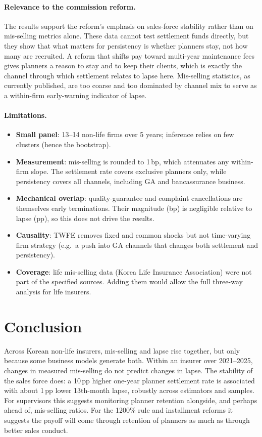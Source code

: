 \documentclass[11pt,a4paper]{article}
\begin{document}
\paragraph{Relevance to the commission reform.} The results support the reform's emphasis on sales-force
stability rather than on mis-selling metrics alone. These data cannot test settlement funds directly, but they show
that what matters for persistency is whether planners stay, not how many are recruited. A reform that shifts pay toward multi-year maintenance fees gives
planners a reason to stay and to keep their clients, which is exactly the channel through which settlement
relates to lapse here. Mis-selling statistics, as currently published, are too coarse and too dominated by
channel mix to serve as a within-firm early-warning indicator of lapse.

\paragraph{Limitations.}
\begin{itemize}
  \item \textbf{Small panel}: 13--14 non-life firms over 5 years; inference relies on few clusters (hence the bootstrap).
  \item \textbf{Measurement}: mis-selling is rounded to 1\,bp, which attenuates any within-firm slope. The
        settlement rate covers exclusive planners only, while persistency covers all channels, including GA and
        bancassurance business.
  \item \textbf{Mechanical overlap}: quality-guarantee and complaint cancellations are themselves early
        terminations. Their magnitude (bp) is negligible relative to lapse (pp), so this does not drive the results.
  \item \textbf{Causality}: TWFE removes fixed and common shocks but not time-varying firm strategy (e.g.\ a push into GA channels that changes both settlement and persistency).
  \item \textbf{Coverage}: life mis-selling data (Korea Life Insurance Association) were not part of the specified sources. Adding them would allow the full three-way analysis for life insurers.
\end{itemize}

\section{Conclusion}
Across Korean non-life insurers, mis-selling and lapse rise together, but only because some business models
generate both. Within an insurer over 2021--2025, changes in measured mis-selling do not predict changes in
lapse. The stability of the sales force does: a 10\,pp higher one-year planner settlement rate is associated
with about 1\,pp lower 13th-month lapse, robustly across estimators and samples. For supervisors this
suggests monitoring planner retention alongside, and perhaps ahead of, mis-selling ratios. For the 1200\% rule
and installment reforms it suggests the payoff will come through retention of planners as much as through
better sales conduct.
\end{document}
